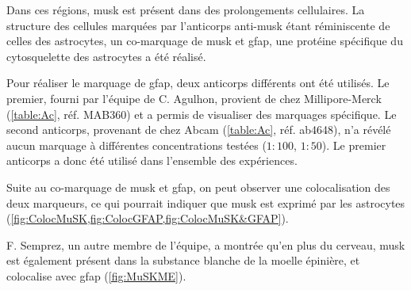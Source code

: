 \begin{figure}[h]
		\label{fig:ImmunoMusk}
	\end{figure}
	
	Dans ces régions, \gls{musk} est présent dans des prolongements cellulaires. La structure des cellules marquées par l'anticorps anti-\gls{musk} étant réminiscente de celles des astrocytes, un co-marquage de \gls{musk} et \gls{gfap}, une protéine spécifique du cytosquelette des astrocytes a été réalisé.
	
	Pour réaliser le marquage de \gls{gfap}, deux anticorps différents ont été utilisés. Le premier, fourni par l'équipe de C. Agulhon, provient de chez Millipore-Merck (\cref{table:Ac}, réf. MAB360) et a permis de visualiser des marquages spécifique. Le second anticorps, provenant de chez Abcam (\cref{table:Ac}, réf. ab4648), n'a révélé aucun marquage à différentes concentrations testées ($1{:}100$, $1{:}50$). Le premier anticorps a donc été utilisé dans l'ensemble des expériences.
	
	Suite au co-marquage de \gls{musk} et \gls{gfap}, on peut observer une colocalisation des deux marqueurs, ce qui pourrait indiquer que \gls{musk} est exprimé par les astrocytes (\cref{fig:ColocMuSK,fig:ColocGFAP,fig:ColocMuSK&GFAP}). 
	
	F. Semprez, un autre membre de l'équipe, a montrée qu'en plus du cerveau, \gls{musk} est également présent dans la substance blanche de la moelle épinière, et colocalise avec \gls{gfap} (\cref{fig:MuSKME}).
	
